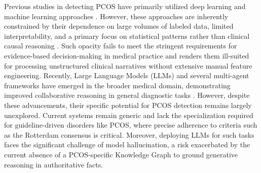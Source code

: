 \documentclass[a4paper,fleqn]{cas-dc}
\begin{document}
Previous studies in detecting PCOS have primarily utilized deep learning and machine learning approaches \cite{aggarwal2023early,tiwari2022sposds,65chauhan2021comparative,46abouhawwash2023automatic}. However, these approaches are inherently constrained by their dependence on large volumes of labeled data, limited interpretability, and a primary focus on statistical patterns rather than clinical causal reasoning \cite{li2025intelligent}. Such opacity fails to meet the stringent requirements for evidence-based decision-making in medical practice and renders them ill-suited for processing unstructured clinical narratives without extensive manual feature engineering. Recently, Large Language Models (LLMs) and several multi-agent frameworks have emerged in the broader medical domain, demonstrating improved collaborative reasoning in general diagnostic tasks \cite{kim2024mdagents,tang-etal-2024-medagents,li2024agent}. However, despite these advancements, their specific potential for PCOS detection remains largely unexplored. Current systems remain generic and lack the specialization required for guideline-driven disorders like PCOS, where precise adherence to criteria such as the Rotterdam consensus is critical. Moreover, deploying LLMs for such tasks faces the significant challenge of model hallucination, a risk exacerbated by the current absence of a PCOS-specific Knowledge Graph to ground generative reasoning in authoritative facts.

\end{document}
